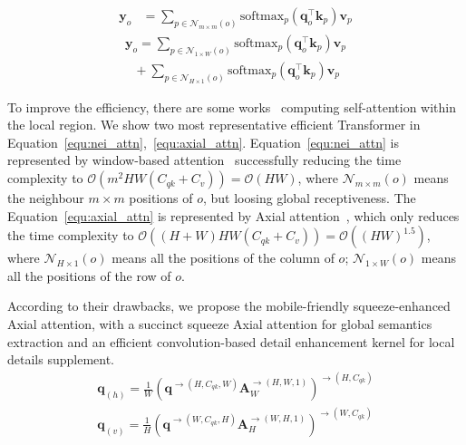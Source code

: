 \begin{align}
    \label{equ:nei_attn} \mathbf{y}_o &= \sum_{p\in \mathcal{N}_{m\times m}(o)}\text{softmax}_p\left(\mathbf{q}_o^\top \mathbf{k}_p \right)\mathbf{v}_p
\end{align}
\begin{equation}
\begin{split}
    \label{equ:axial_attn} \mathbf{y}_o = \sum_{p\in \mathcal{N}_{1\times W}(o) }\text{softmax}_p\left(\mathbf{q}_o^\top \mathbf{k}_p \right)\mathbf{v}_p \\
    ~~~+ \sum_{p\in \mathcal{N}_{H\times 1}(o) }\text{softmax}_p\left(\mathbf{q}_o^\top \mathbf{k}_p \right)\mathbf{v}_p
\end{split}
\end{equation}

To improve the efficiency, there are some works~\cite{liu2021swin,huang2019ccnet,ho2019axial} computing self-attention within the local region. 
We show two most representative efficient Transformer in Equation~\ref{equ:nei_attn},~\ref{equ:axial_attn}.
Equation~\ref{equ:nei_attn} is represented by window-based attention~\cite{luong2015effective} successfully reducing the time complexity to $\mathcal{O}(m^2HW(C_{qk}+C_v))=\mathcal{O}(HW)$, where $\mathcal{N}_{m\times m}(o)$ means the neighbour $m\times m$ positions of $o$, but loosing global receptiveness.
The Equation~\ref{equ:axial_attn} is represented by Axial attention~\cite{ho2019axial}, which only reduces the time complexity to $\mathcal{O}((H+W)HW(C_{qk}+C_v))=\mathcal{O}((HW)^{1.5})$, where $\mathcal{N}_{H\times 1}(o)$ means all the positions of the column of $o$; $\mathcal{N}_{1\times W}(o)$ means all the positions of the row of $o$.

According to their drawbacks, we propose the mobile-friendly squeeze-enhanced Axial attention, with a succinct squeeze Axial attention for global semantics extraction and an efficient convolution-based detail enhancement kernel for local details supplement.
\begin{equation}
\begin{split}
\label{equ:hori_ver_squ}
    \mathbf{q}_{(h)} = \frac{1}{W}\left(\mathbf{q}^{\rightarrow(H,C_{qk}, W)}\mathbf{A}_W^{\rightarrow(H,W,1)}\right)^{\rightarrow(H, C_{qk})} \\
    \mathbf{q}_{(v)} = \frac{1}{H}\left(\mathbf{q}^{\rightarrow(W, C_{qk}, H)}\mathbf{A}_H^{\rightarrow(W,H,1)}\right)^{\rightarrow(W, C_{qk})}
    \end{split}
\end{equation}

